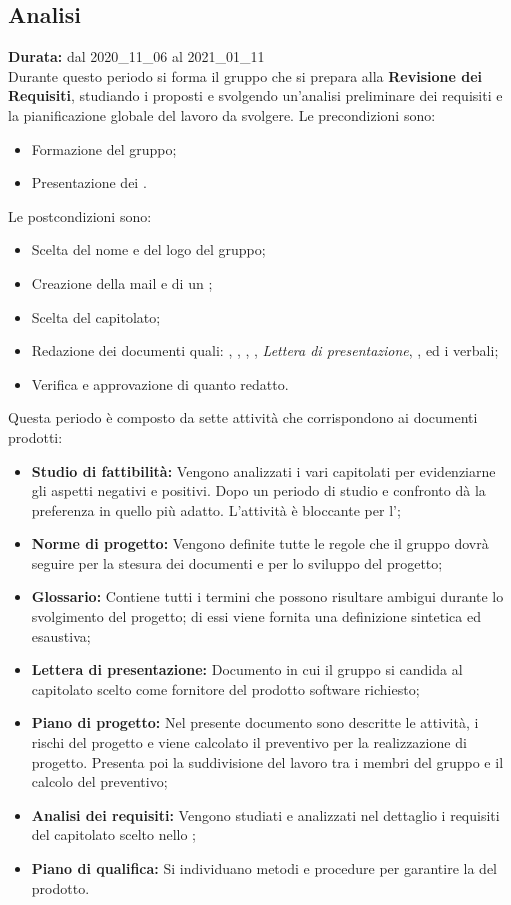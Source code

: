 \subsection{Analisi}
\label{analisi}
\textbf{Durata:} dal 2020\_11\_06 al 2021\_01\_11\\
Durante questo periodo si forma il gruppo che si prepara alla \textbf{Revisione dei Requisiti}, studiando i  proposti e svolgendo un'analisi preliminare dei requisiti e la pianificazione globale del lavoro da svolgere. 
Le precondizioni sono:
\begin{itemize}
    \item Formazione del gruppo;
    \item Presentazione dei .
\end{itemize}
Le postcondizioni sono:
\begin{itemize}
    \item Scelta del nome e del logo del gruppo;
    \item Creazione della mail e di un  ;
    \item Scelta del capitolato;
    \item Redazione dei documenti quali: {\SdF}, {\NdP}, {\PdP}, {\Glossario}, \textit{Lettera di presentazione}, {\PdQ}, {\AdR} ed i verbali;
    \item Verifica e approvazione di quanto redatto.
\end{itemize}
Questa periodo è composto da sette attività che corrispondono ai documenti prodotti:
\begin{itemize}
    \item \textbf{Studio di fattibilità:} Vengono analizzati i vari capitolati per evidenziarne gli aspetti negativi e positivi. Dopo un periodo di studio e confronto {\Gruppo} dà la preferenza in quello più adatto. L'attività è bloccante per l'{\AdR};
    \item \textbf{Norme di progetto:} Vengono definite tutte le regole che il gruppo {\Gruppo} dovrà seguire per la stesura dei documenti e per lo sviluppo del progetto;
    \item \textbf{Glossario:} Contiene tutti i termini che possono risultare ambigui durante lo svolgimento del progetto; di essi viene fornita una definizione sintetica ed esaustiva;
    \item \textbf{Lettera di presentazione:} Documento in cui il gruppo {\Gruppo} si candida al capitolato scelto come fornitore del prodotto software richiesto;
    \item \textbf{Piano di progetto:} Nel presente documento sono descritte le attività, i rischi del progetto e viene calcolato il preventivo per la realizzazione di progetto. Presenta poi la suddivisione del lavoro tra i membri del gruppo {\Gruppo} e il calcolo del preventivo;
    \item \textbf{Analisi dei requisiti:} Vengono studiati e analizzati nel dettaglio i requisiti del capitolato scelto nello {\SdF};
    \item \textbf{Piano di qualifica:} Si individuano metodi e procedure per garantire la  del prodotto.
\end{itemize}
